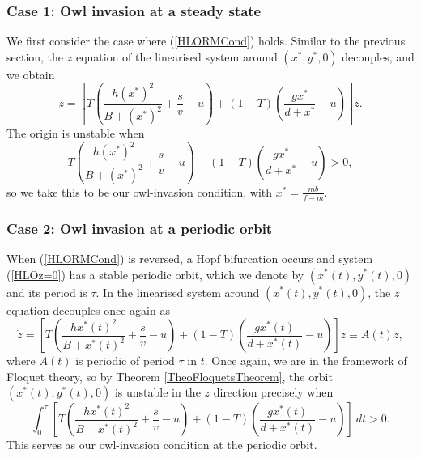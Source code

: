 \documentclass[12pt]{UOthesis}
\theoremstyle{remarkstyle}
\begin{document}
\subsubsection*{Case 1: Owl invasion at a steady state}

We first consider the case where (\ref{HLORMCond}) holds. Similar to the previous section, the $z$ equation of the linearised system around $(x^*,y^*,0)$ decouples, and we obtain
$$\dot{z}=\left[T\left(\frac{h(x^*)^2}{B+(x^*)^2}+\frac{s}{v}-u\right)+(1-T)\left(\frac{gx^*}{d+x^*}-u\right)\right]z.$$
The origin is unstable when
\begin{equation}
	T\left(\frac{h(x^*)^2}{B+(x^*)^2}+\frac{s}{v}-u\right)+(1-T)\left(\frac{gx^*}{d+x^*}-u\right)>0,
	\label{HLOOwlICSteadyState}
\end{equation}
so we take this to be our owl-invasion condition, with $x^*=\frac{mb}{f-m}$.

\subsubsection*{Case 2: Owl invasion at a periodic orbit}

When (\ref{HLORMCond}) is reversed, a Hopf bifurcation occurs and system (\ref{HLOz=0}) has a stable periodic orbit, which we denote by $(x^*(t),y^*(t),0)$ and its period is $\tau$. In the linearised system around $(x^*(t),y^*(t),0)$, the $z$ equation decouples once again as
$$\dot{z}=\left[T\left(\frac{hx^*(t)^2}{B+x^*(t)^2}+\frac{s}{v}-u\right)+(1-T)\left(\frac{gx^*(t)}{d+x^*(t)}-u\right)\right]z\equiv A(t)z,$$
where $A(t)$ is periodic of period $\tau$ in $t$. Once again, we are in the framework of Floquet theory, so by Theorem \ref{TheoFloquetsTheorem}, the orbit $(x^*(t),y^*(t),0)$ is unstable in the $z$ direction precisely when
\begin{equation}
	\int_0^\tau \left[T\left(\frac{hx^*(t)^2}{B+x^*(t)^2}+\frac{s}{v}-u\right)+(1-T)\left(\frac{gx^*(t)}{d+x^*(t)}-u\right)\right]\ dt>0.
	\label{HLOOwlICPerOrb}
\end{equation}
This serves as our owl-invasion condition at the periodic orbit.\\
\end{document}
